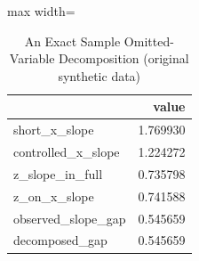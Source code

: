 \begin{table}[htbp]
\centering
\caption{An Exact Sample Omitted-Variable Decomposition (original synthetic data)}
\begingroup
\small
\setlength{\tabcolsep}{6pt}
\renewcommand{\arraystretch}{1.12}
\begin{adjustbox}{max width=\linewidth}
\begin{tabular}{@{}lr@{}}
\toprule
 & value \\
\midrule
short\_x\_slope & 1.769930 \\
controlled\_x\_slope & 1.224272 \\
z\_slope\_in\_full & 0.735798 \\
z\_on\_x\_slope & 0.741588 \\
observed\_slope\_gap & 0.545659 \\
decomposed\_gap & 0.545659 \\
\bottomrule
\end{tabular}
\end{adjustbox}
\endgroup
\end{table}